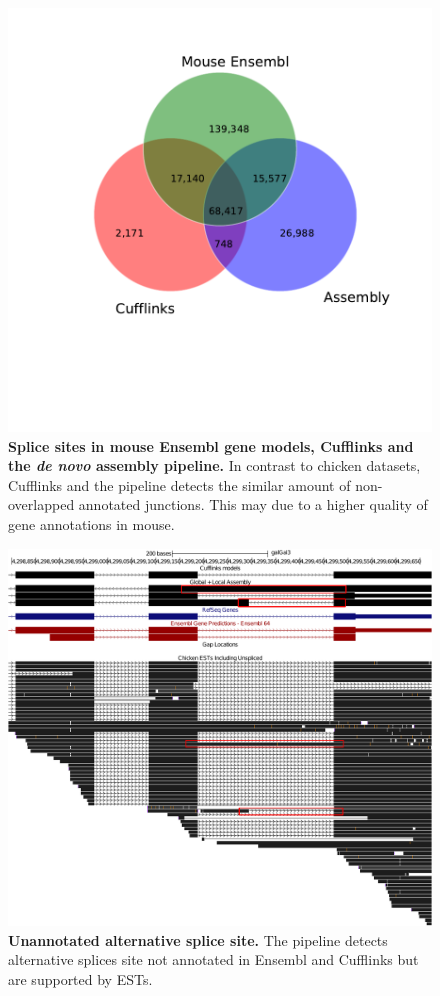 \documentclass[10pt]{article}
\begin{document}
\begin{figure}[!ht]
\begin{center}
\includegraphics[width=5in]{mus_venn.pdf}
\end{center}
\caption{
{\bf Splice sites in mouse Ensembl gene models, Cufflinks and the \emph{de novo} assembly pipeline.}
In contrast to chicken datasets, Cufflinks and the pipeline detects the similar amount of non-overlapped annotated junctions.
This may due to a higher quality of gene annotations in mouse.
}
\label{mus_venn}
\end{figure}

\begin{figure}[!ht]
\begin{center}
\includegraphics[width=5in]{alt_splice_site.pdf}
\end{center}
\caption{
{\bf Unannotated alternative splice site.}
The pipeline detects alternative splices site not annotated in Ensembl and Cufflinks but are supported by ESTs.
}
\label{alt_splice_site}
\end{figure}
\end{document}
